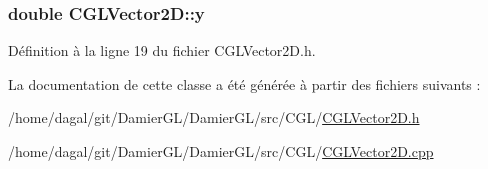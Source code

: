 \hypertarget{class_c_g_l_vector2_d_a36a88cf9827f308a125e51164c73e21f}{
\subsubsection[{y}]{\setlength{\rightskip}{0pt plus 5cm}double C\-G\-L\-Vector2\-D\-::y\hspace{0.3cm}{\ttfamily [protected]}}}\label{class_c_g_l_vector2_d_a36a88cf9827f308a125e51164c73e21f}


Définition à la ligne 19 du fichier C\-G\-L\-Vector2\-D.\-h.



La documentation de cette classe a été générée à partir des fichiers suivants \-:\begin{DoxyCompactItemize}
\item 
/home/dagal/git/\-Damier\-G\-L/\-Damier\-G\-L/src/\-C\-G\-L/\hyperlink{_c_g_l_vector2_d_8h}{C\-G\-L\-Vector2\-D.\-h}\item 
/home/dagal/git/\-Damier\-G\-L/\-Damier\-G\-L/src/\-C\-G\-L/\hyperlink{_c_g_l_vector2_d_8cpp}{C\-G\-L\-Vector2\-D.\-cpp}\end{DoxyCompactItemize}
